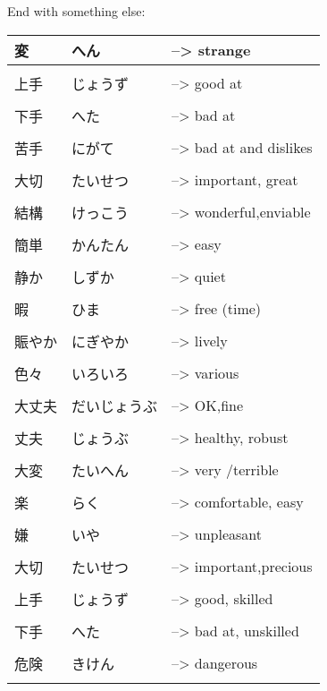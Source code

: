 \documentclass{article}
\begin{document}
End with something else: \\
\begin{tabular}{ l | l l }
変&へん&--> strange \\ \hline\\[-1em]
上手&じょうず&--> good at \\ \hline\\[-1em]
下手&へた&--> bad at \\ \hline\\[-1em]
苦手&にがて&--> bad at and dislikes \\ \hline\\[-1em]
大切 &たいせつ&--> important, great\\ \hline\\[-1em]
結構 &けっこう&--> wonderful,enviable\\ \hline\\[-1em]
簡単 &かんたん&--> easy\\ \hline\\[-1em]
静か&しずか&--> quiet\\ \hline\\[-1em]
暇&ひま&--> free (time)\\ \hline\\[-1em]
賑やか&にぎやか&--> lively\\ \hline\\[-1em]
色々&いろいろ&--> various\\ \hline\\[-1em]
大丈夫&だいじょうぶ&--> OK,fine\\ \hline\\[-1em]
丈夫&じょうぶ&--> healthy, robust\\ \hline\\[-1em]
大変&たいへん&--> very /terrible\\ \hline\\[-1em]
楽 &らく&--> comfortable, easy\\ \hline\\[-1em]
嫌 &いや&--> unpleasant\\ \hline\\[-1em]
大切 &たいせつ&--> important,precious\\ \hline\\[-1em]
上手&じょうず&--> good, skilled\\ \hline\\[-1em]
下手&へた&--> bad at, unskilled\\ \hline\\[-1em]
危険&きけん&--> dangerous\\ \hline\\[-1em]

\end{tabular}
\end{document}
